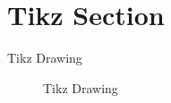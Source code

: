 \section{Tikz Section}
\begin{frame}{Tikz Drawing}
\begin{figure}[h]
    \centering
    \caption{Tikz Drawing}
    \label{fig:2}
\end{figure}   
\end{frame}

